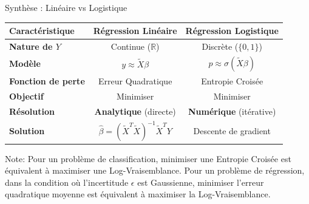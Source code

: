\begin{frame}{Synthèse : Linéaire vs Logistique}
	\begin{table}
		\renewcommand{\arraystretch}{1.5} %
		\begin{tabular}{|l|c|c|}
			\hline
			\textbf{Caractéristique} & \textbf{Régression Linéaire} & \textbf{Régression Logistique} \\ \hline
			\textbf{Nature de $Y$} & Continue ($\mathbb{R}$) & Discrète ($\{0, 1\}$) \\ \hline
			\textbf{Modèle} & $y \approx \tilde{X}\beta$ & $p \approx \sigma(\tilde{X}\beta)$ \\ \hline
			\textbf{Fonction de perte} & Erreur Quadratique & Entropie Croisée \\ \hline
			\textbf{Objectif} & Minimiser & Minimiser \\ \hline
			\textbf{Résolution} & \textbf{Analytique} (directe) & \textbf{Numérique} (itérative) \\ \hline
			\textbf{Solution} & $\hat{\beta} = (\tilde{X}^T\tilde{X})^{-1}\tilde{X}^TY$ & Descente de gradient \\ \hline
		\end{tabular}
	\end{table}
	Note: Pour un problème de classification, minimiser une Entropie Croisée est équivalent à maximiser une Log-Vraisemblance. Pour un problème de régression, dans la condition où l'incertitude $\epsilon$ est Gaussienne, minimiser l'erreur quadratique moyenne est équivalent à maximiser la Log-Vraisemblance.
\end{frame}
